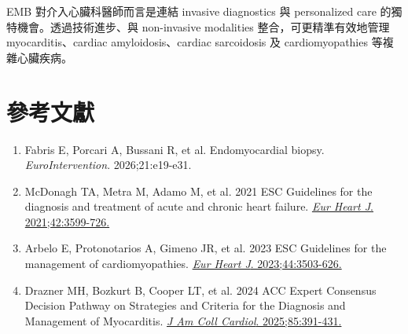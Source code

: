 \documentclass[12pt,a4paper]{article}
\begin{document}
EMB 對介入心臟科醫師而言是連結 invasive diagnostics 與 personalized care 的獨特機會。透過技術進步、與 non-invasive modalities 整合，可更精準有效地管理 myocarditis、cardiac amyloidosis、cardiac sarcoidosis 及 cardiomyopathies 等複雜心臟疾病。

\section{參考文獻}

\begin{enumerate}
    \item Fabris E, Porcari A, Bussani R, et al. Endomyocardial biopsy. \textit{EuroIntervention}. 2026;21:e19-e31.
    \item McDonagh TA, Metra M, Adamo M, et al. 2021 ESC Guidelines for the diagnosis and treatment of acute and chronic heart failure. \href{https://doi.org/10.1093/eurheartj/ehab368}{\textit{Eur Heart J}. 2021;42:3599-726.}
    \item Arbelo E, Protonotarios A, Gimeno JR, et al. 2023 ESC Guidelines for the management of cardiomyopathies. \href{https://doi.org/10.1093/eurheartj/ehad194}{\textit{Eur Heart J}. 2023;44:3503-626.}
    \item Drazner MH, Bozkurt B, Cooper LT, et al. 2024 ACC Expert Consensus Decision Pathway on Strategies and Criteria for the Diagnosis and Management of Myocarditis. \href{https://doi.org/10.1016/j.jacc.2024.10.080}{\textit{J Am Coll Cardiol}. 2025;85:391-431.}
\end{enumerate}
\end{document}
